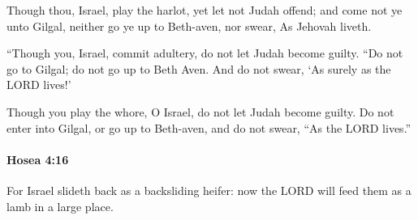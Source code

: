 			\begin{versebox}
					\item[BHS] 
					\item[LXX] 
					\item[ASV] Though thou, Israel, play the harlot, yet let not Judah offend; and come not ye unto Gilgal, neither go ye up to Beth-aven, nor swear, As Jehovah liveth.
					\item[NIV] “Though you, Israel, commit adultery, do not let Judah become guilty. “Do not go to Gilgal; do not go up to Beth Aven. And do not swear, ‘As surely as the LORD lives!’
					\item[NRSV] Though you play the whore, O Israel, do not let Judah become guilty. Do not enter into Gilgal, or go up to Beth-aven, and do not swear, “As the LORD lives.”
			\end{versebox}

		\paragraph{Hosea 4:16} %
			\label{HOSEA-4-16}

			For Israel slideth back as a backsliding heifer: now the LORD will feed them as a lamb in a large place.

